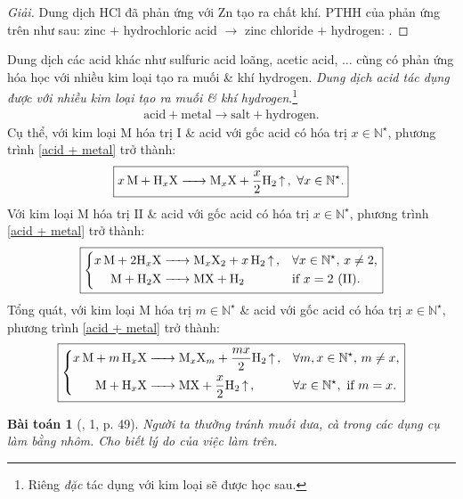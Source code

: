 \documentclass{article}
\newtheorem{baitoan}{Bài toán}
\begin{document}
\begin{proof}[Giải]
	Dung dịch HCl đã phản ứng với Zn tạo ra chất khí. PTHH của phản ứng trên như sau: zinc $+$ hydrochloric acid $\to$ zinc chloride $+$ hydrogen: .
\end{proof}
Dung dịch các acid khác như sulfuric acid loãng, acetic acid, $\ldots$ cũng có phản ứng hóa học với nhiều kim loại tạo ra muối \& khí hydrogen. \textit{Dung dịch acid tác dụng được với nhiều kim loại tạo ra muối \& khí hydrogen}.\footnote{Riêng  \textit{đặc} tác dụng với kim loại sẽ được học sau.}
\begin{align}
	\label{acid + metal}
	\boxed{\mbox{acid} + \mbox{metal}\to\mbox{salt} + \mbox{hydrogen}.}
\end{align}
Cụ thể, với kim loại M hóa trị I \& acid  với gốc acid  có hóa trị $x\in\mathbb{N}^\star$, phương trình \eqref{acid + metal} trở thành:
\begin{align}
	\boxed{\ce{$x$M + H_xX -> M_xX + $\frac{x}{2}$H2 ^},\ \forall x\in\mathbb{N}^\star.}
\end{align}
Với kim loại M hóa trị II \& acid  với gốc acid  có hóa trị $x\in\mathbb{N}^\star$, phương trình \eqref{acid + metal} trở thành:
\begin{equation}
	\boxed{\left\{\begin{split}
			\ce{$x$M + $2$H_xX &-> M_xX2 + $x$H2 ^},&&\forall x\in\mathbb{N}^\star,\,x\ne2,\\
			\ce{M + H2X &-> MX + H2}&&\mbox{if } x = 2\ (\mbox{II}).
		\end{split}\right.}
\end{equation}
Tổng quát, với kim loại M hóa trị $m\in\mathbb{N}^\star$ \& acid  với gốc acid  có hóa trị $x\in\mathbb{N}^\star$, phương trình \eqref{acid + metal} trở thành:
\begin{equation}
	\boxed{\left\{\begin{split}
			\ce{$x$M + $m$H_xX &-> M_xX_m + $\frac{mx}{2}$H2 ^},&&\forall m,x\in\mathbb{N}^\star,\,m\ne x,\\
			\ce{M + H_xX &-> MX + $\frac{x}{2}$H2 ^},&&\forall x\in\mathbb{N}^\star,\mbox{ if } m = x.
		\end{split}\right.}
\end{equation}

\begin{baitoan}[\cite{SGK_KHTN_8_Canh_Dieu}, 1, p. 49]
	Người ta thường tránh muối dưa, cà trong các dụng cụ làm bằng nhôm. Cho biết lý do của việc làm trên.
\end{baitoan}
\end{document}
